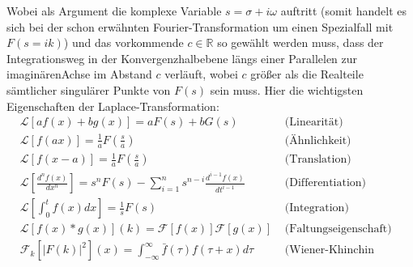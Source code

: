 Wobei als Argument die komplexe Variable $s=\sigma + i\omega$ auftritt (somit handelt es sich
bei der schon erwähnten Fourier-Transformation um einen Spezialfall mit $F(s = ik)$) und
das vorkommende $c\in \mathbb{R}$ so gewählt werden muss, dass der Integrationsweg in der 
Konvergenzhalbebene längs einer Parallelen zur imaginärenAchse im Abstand $c$ verläuft, wobei
$c$ größer als die Realteile sämtlicher singulärer Punkte von $F(s)$ sein muss.
Hier die wichtigsten Eigenschaften der Laplace-Transformation:
\begin{align}
&\mathcal{L}\left [a f(x) + b g(x)\right ]
    = a F(s) + b G(s) 
    &\mbox{ (Linearität) }\\

&\mathcal{L}\left [f(ax)\right ]
    = \frac{1}{a}F(\frac{s}{a}) 
    &\mbox{ (Ähnlichkeit) }\\

&\mathcal{L}\left [f(x-a)\right ]
    = \frac{1}{a}F(\frac{s}{a}) 
    &\mbox{ (Translation) }\\

&\mathcal{L}\left [\frac{d^nf(x)}{dx^n}\right ]
    = s^nF(s) - \sum_{i=1}^{n}s^{n-i}\frac{d^{i-1}f(x)}{dt^{i-1}} 
    &\mbox{ (Differentiation) }\\

&\mathcal{L}\left [\int_{0}^{t}f(x)dx\right ]
    = \frac{1}{s}F(s) &\mbox{ (Integration) }\\

&\mathcal{L}\left [f(x) * g(x)\right ](k)
    = \mathcal{F}\left [f(x)\right ]\mathcal{F}\left [g(x)\right ]
    \! &\mbox{ (Faltungseigenschaft) }\\
&\mathcal{F}_k\left [\left | F(k) \right |^2\right ](x)
   =  \int_{-\infty}^{\infty}\bar{f}(\tau)f(\tau + x) d\tau 
   &\mbox{ (Wiener-Khinchin Theorem) }
\end{align}




